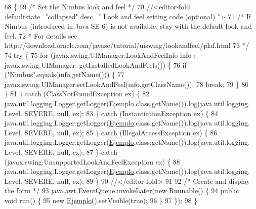 \begin{DoxyCode}
68                                            \{
69         \textcolor{comment}{/* Set the Nimbus look and feel */}
70         \textcolor{comment}{//<editor-fold defaultstate="collapsed" desc=" Look and feel setting code (optional) ">}
71         \textcolor{comment}{/* If Nimbus (introduced in Java SE 6) is not available, stay with the default look and feel.}
72 \textcolor{comment}{         * For details see http://download.oracle.com/javase/tutorial/uiswing/lookandfeel/plaf.html }
73 \textcolor{comment}{         */}
74         \textcolor{keywordflow}{try} \{
75             \textcolor{keywordflow}{for} (javax.swing.UIManager.LookAndFeelInfo info : javax.swing.UIManager.
      getInstalledLookAndFeels()) \{
76                 \textcolor{keywordflow}{if} (\textcolor{stringliteral}{"Nimbus"}.equals(info.getName())) \{
77                     javax.swing.UIManager.setLookAndFeel(info.getClassName());
78                     \textcolor{keywordflow}{break};
79                 \}
80             \}
81         \} \textcolor{keywordflow}{catch} (ClassNotFoundException ex) \{
82             java.util.logging.Logger.getLogger(\mbox{\hyperlink{classsesion3labprogavanzada_1_1_ejemplo_a8e39fb4b471c241ca4320630761ba9ec}{Ejemplo}}.class.getName()).log(java.util.logging.Level.
      SEVERE, null, ex);
83         \} \textcolor{keywordflow}{catch} (InstantiationException ex) \{
84             java.util.logging.Logger.getLogger(\mbox{\hyperlink{classsesion3labprogavanzada_1_1_ejemplo_a8e39fb4b471c241ca4320630761ba9ec}{Ejemplo}}.class.getName()).log(java.util.logging.Level.
      SEVERE, null, ex);
85         \} \textcolor{keywordflow}{catch} (IllegalAccessException ex) \{
86             java.util.logging.Logger.getLogger(\mbox{\hyperlink{classsesion3labprogavanzada_1_1_ejemplo_a8e39fb4b471c241ca4320630761ba9ec}{Ejemplo}}.class.getName()).log(java.util.logging.Level.
      SEVERE, null, ex);
87         \} \textcolor{keywordflow}{catch} (javax.swing.UnsupportedLookAndFeelException ex) \{
88             java.util.logging.Logger.getLogger(\mbox{\hyperlink{classsesion3labprogavanzada_1_1_ejemplo_a8e39fb4b471c241ca4320630761ba9ec}{Ejemplo}}.class.getName()).log(java.util.logging.Level.
      SEVERE, null, ex);
89         \}
90         \textcolor{comment}{//</editor-fold>}
91 
92         \textcolor{comment}{/* Create and display the form */}
93         java.awt.EventQueue.invokeLater(\textcolor{keyword}{new} Runnable() \{
94             \textcolor{keyword}{public} \textcolor{keywordtype}{void} run() \{
95                 \textcolor{keyword}{new} \mbox{\hyperlink{classsesion3labprogavanzada_1_1_ejemplo_a8e39fb4b471c241ca4320630761ba9ec}{Ejemplo}}().setVisible(\textcolor{keyword}{true});
96             \}
97         \});
98     \}
\end{DoxyCode}


